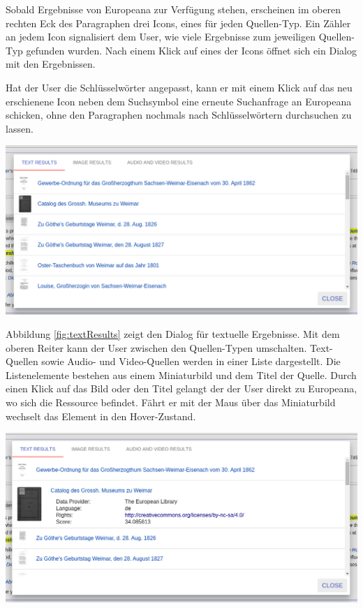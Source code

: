  Sobald Ergebnisse von Europeana zur Verfügung stehen, erscheinen im oberen rechten Eck des Paragraphen drei Icons, eines für jeden Quellen-Typ. Ein Zähler an jedem Icon signalisiert dem User, wie viele Ergebnisse zum jeweiligen Quellen-Typ gefunden wurden. Nach einem Klick auf eines der Icons öffnet sich ein Dialog mit den Ergebnissen.

 Hat der User die Schlüsselwörter angepasst, kann er mit einem Klick auf das neu erschienene Icon neben dem Suchsymbol eine erneute Suchanfrage an Europeana schicken, ohne den Paragraphen nochmals nach Schlüsselwörtern durchsuchen zu lassen.

 \begin{minipage}{\linewidth}
	\centering
	\vspace*{0.5cm}
	\includegraphics[width=\linewidth]{Bilder/app-screenshots/text-results.png}
	\label{fig:textResults}
	\vspace*{0.5cm}
 \end{minipage}

 Abbildung \ref{fig:textResults} zeigt den Dialog für textuelle Ergebnisse. Mit dem oberen Reiter kann der User zwischen den Quellen-Typen umschalten. Text-Quellen sowie Audio- und Video-Quellen werden in einer Liste dargestellt. Die Listenelemente bestehen aus einem Miniaturbild und dem Titel der Quelle. Durch einen Klick auf das Bild oder den Titel gelangt der der User direkt zu Europeana, wo sich die Ressource befindet. Fährt er mit der Maus über das Miniaturbild wechselt das Element in den Hover-Zustand. 

 \begin{minipage}{\linewidth}
	\centering
	\vspace*{0.5cm}
	\includegraphics[width=\linewidth]{Bilder/app-screenshots/text-results-hovered.png}
	\label{fig:textResultsHover}
	\vspace*{0.5cm}
 \end{minipage}


